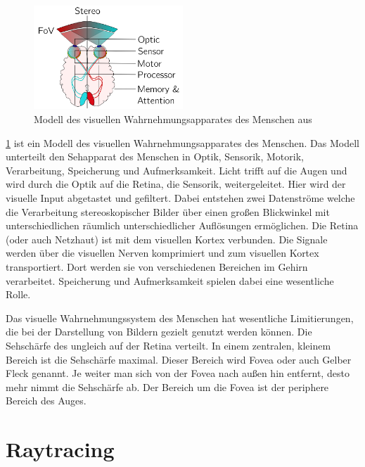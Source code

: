 \begin{figure}
	\centering
	\includegraphics[width=0.5\textwidth]{../../Grafiken/HVS-model_from-star-report.png}
	\caption{Modell des visuellen Wahrnehmungsapparates des Menschen aus \cite{doi:10.1111/cfg.13150}}
	\label{fig:eye01}
\end{figure}

\ref{fig:eye01} ist ein Modell des visuellen Wahrnehmungsapparates des Menschen.
Das Modell unterteilt den Sehapparat des Menschen in Optik, Sensorik, Motorik, Verarbeitung, Speicherung und Aufmerksamkeit.
Licht trifft auf die Augen und wird durch die Optik auf die Retina, die Sensorik, weitergeleitet.
Hier wird der visuelle Input abgetastet und gefiltert.
Dabei entstehen zwei Datenströme welche die Verarbeitung stereoskopischer Bilder über einen großen Blickwinkel mit unterschiedlichen räumlich unterschiedlicher Auflösungen ermöglichen.
Die Retina (oder auch Netzhaut) ist mit dem visuellen Kortex verbunden.
Die Signale werden über die visuellen Nerven komprimiert und zum visuellen Kortex transportiert.
Dort werden sie von verschiedenen Bereichen im Gehirn verarbeitet.
Speicherung und Aufmerksamkeit spielen dabei eine wesentliche Rolle.

Das visuelle Wahrnehmungssystem des Menschen hat wesentliche Limitierungen, die bei der Darstellung von Bildern gezielt genutzt werden können.
Die Sehschärfe des ungleich auf der Retina verteilt.
In einem zentralen, kleinem Bereich ist die Sehschärfe maximal.
Dieser Bereich wird Fovea oder auch Gelber Fleck genannt.
Je weiter man sich von der Fovea nach außen hin entfernt, desto mehr nimmt die Sehschärfe ab.
Der Bereich um die Fovea ist der periphere Bereich des Auges.


\section{Raytracing}\label{sec::rc}

